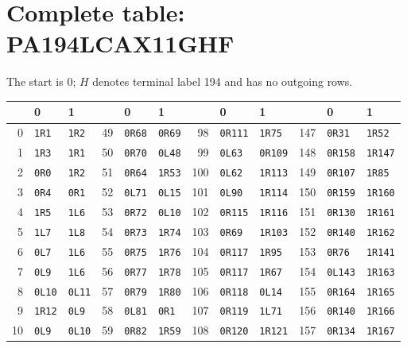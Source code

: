 \section{Complete table: PA194LCAX11GHF}
\label{tab:PA194LCAX11GHF}
The start is 0; $H$ denotes terminal label 194 and has no outgoing rows.
\begin{center}\small\setlength{\tabcolsep}{4pt}
\begin{tabular}{rll@{\qquad}rll@{\qquad}rll@{\qquad}rll}
\toprule
 & 0 & 1 & & 0 & 1 & & 0 & 1 & & 0 & 1\\
\midrule
0 & \texttt{1R1} & \texttt{1R2} & 49 & \texttt{0R68} & \texttt{0R69} & 98 & \texttt{0R111} & \texttt{1R75} & 147 & \texttt{0R31} & \texttt{1R52}\\
1 & \texttt{1R3} & \texttt{1R1} & 50 & \texttt{0R70} & \texttt{0L48} & 99 & \texttt{0L63} & \texttt{0R109} & 148 & \texttt{0R158} & \texttt{1R147}\\
2 & \texttt{0R0} & \texttt{1R2} & 51 & \texttt{0R64} & \texttt{1R53} & 100 & \texttt{0L62} & \texttt{1R113} & 149 & \texttt{0R107} & \texttt{1R85}\\
3 & \texttt{0R4} & \texttt{0R1} & 52 & \texttt{0L71} & \texttt{0L15} & 101 & \texttt{0L90} & \texttt{1R114} & 150 & \texttt{0R159} & \texttt{1R160}\\
4 & \texttt{1R5} & \texttt{1L6} & 53 & \texttt{0R72} & \texttt{0L10} & 102 & \texttt{0R115} & \texttt{1R116} & 151 & \texttt{0R130} & \texttt{1R161}\\
5 & \texttt{1L7} & \texttt{1L8} & 54 & \texttt{0R73} & \texttt{1R74} & 103 & \texttt{0R69} & \texttt{1R103} & 152 & \texttt{0R140} & \texttt{1R162}\\
6 & \texttt{0L7} & \texttt{1L6} & 55 & \texttt{0R75} & \texttt{1R76} & 104 & \texttt{0R117} & \texttt{1R95} & 153 & \texttt{0R76} & \texttt{1R141}\\
7 & \texttt{0L9} & \texttt{1L6} & 56 & \texttt{0R77} & \texttt{1R78} & 105 & \texttt{0R117} & \texttt{1R67} & 154 & \texttt{0L143} & \texttt{1R163}\\
8 & \texttt{0L10} & \texttt{0L11} & 57 & \texttt{0R79} & \texttt{1R80} & 106 & \texttt{0R118} & \texttt{0L14} & 155 & \texttt{0R164} & \texttt{1R165}\\
9 & \texttt{1R12} & \texttt{0L9} & 58 & \texttt{0L81} & \texttt{0R1} & 107 & \texttt{0R119} & \texttt{1L71} & 156 & \texttt{0R140} & \texttt{1R166}\\
10 & \texttt{0L9} & \texttt{0L10} & 59 & \texttt{0R82} & \texttt{1R59} & 108 & \texttt{0R120} & \texttt{1R121} & 157 & \texttt{0R134} & \texttt{1R167}\\

\end{tabular}
\end{center}
